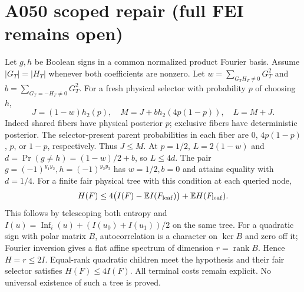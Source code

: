 \documentclass{article}
\begin{document}
\section*{A050 scoped repair (full FEI remains open)}
Let $g,h$ be Boolean signs in a common normalized product Fourier basis.
Assume $|G_T|=|H_T|$ whenever both coefficients are nonzero.
Let $w=\sum_{G_TH_T\ne0}G_T^2$ and
$b=\sum_{G_T=-H_T\ne0}G_T^2$.
For a fresh physical selector with probability $p$ of choosing $h$,
\[
J=(1-w)h_2(p),\quad M=J+b h_2(4p(1-p)),\quad L=M+J.
\]
Indeed shared fibers have physical posterior $p$; exclusive fibers have
deterministic posterior. The selector-present parent probabilities in each
fiber are $0$, $4p(1-p)$, $p$, or $1-p$, respectively.
Thus $J\le M$. At $p=1/2$, $L=2(1-w)$ and
$d=\Pr(g\ne h)=(1-w)/2+b$, so $L\le4d$.
The pair $g=(-1)^{y_1y_2},h=(-1)^{y_2y_3}$ has $w=1/2,b=0$
and attains equality with $d=1/4$.
For a finite fair physical tree with this condition at each queried node,
\[
H(F)\le4\bigl(I(F)-\mathbb E I(F_{\rm leaf})\bigr)
       +\mathbb E H(F_{\rm leaf}).
\]
This follows by telescoping both entropy and
$I(u)=\operatorname{Inf}_i(u)+(I(u_0)+I(u_1))/2$ on the same tree.
For a quadratic sign with polar matrix $B$, autocorrelation is a character
on $\ker B$ and zero off it; Fourier inversion gives a flat affine spectrum
of dimension $r=\operatorname{rank}B$. Hence $H=r\le2I$.
Equal-rank quadratic children meet the hypothesis and their fair selector
satisfies $H(F)\le4I(F)$. All terminal costs remain explicit.
No universal existence of such a tree is proved.
\end{document}
